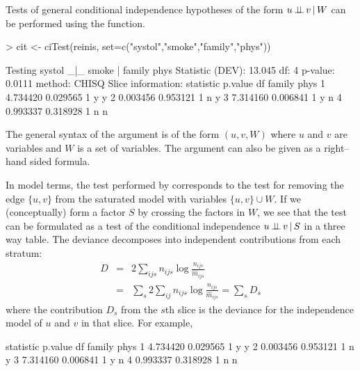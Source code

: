 \documentclass[12pt]{article}
\begin{document}
Tests of general conditional independence hypotheses of the form $u
\mbox{\,$\perp\!\!\!\perp$\,} v \,|\, W$ can be performed using the 
function.

\begin{Schunk}
\begin{Sinput}
> cit <- ciTest(reinis, set=c("systol","smoke","family","phys"))
\end{Sinput}
\begin{Soutput}
Testing systol _|_ smoke | family phys 
Statistic (DEV):   13.045 df: 4 p-value: 0.0111 method: CHISQ
Slice information:
  statistic  p.value df family phys
1  4.734420 0.029565  1      y    y
2  0.003456 0.953121  1      n    y
3  7.314160 0.006841  1      y    n
4  0.993337 0.318928  1      n    n
\end{Soutput}
\end{Schunk}

The general syntax of the  argument is of the form $(u,v,W)$
where $u$ and $v$ are variables and $W$ is a set of variables.
The  argument can also be given as a right--hand sided formula.




In model terms, the test performed by  corresponds to
the test for removing the edge $\{ u, v \}$ from the saturated model
with variables $\{u, v\} \cup W$.  If we (conceptually) form a factor
$S$ by crossing the factors in $W$, we see that the test can be
formulated as a test of the conditional independence $u \mbox{\,$\perp\!\!\!\perp$\,} v\,|\, S$
in a three way table. The deviance decomposes into independent
contributions from each stratum:
\begin{eqnarray*}
\nonumber
 D & =& 2 \sum_{ijs} n_{ijs}\log \frac{n_{ijs}}{\hat m_{ijs}} \\
   &= & \sum_s 2 \sum_{ij} n_{ijs}\log \frac{n_{ijs}}{\hat m_{ijs}}= \sum_s D_s
\end{eqnarray*}
where the contribution $D_s$ from the $s$th slice is the deviance for the independence model of $u$ and $v$ in that slice. For example,

\begin{Schunk}
\begin{Soutput}
  statistic  p.value df family phys
1  4.734420 0.029565  1      y    y
2  0.003456 0.953121  1      n    y
3  7.314160 0.006841  1      y    n
4  0.993337 0.318928  1      n    n
\end{Soutput}
\end{Schunk}
\end{document}
